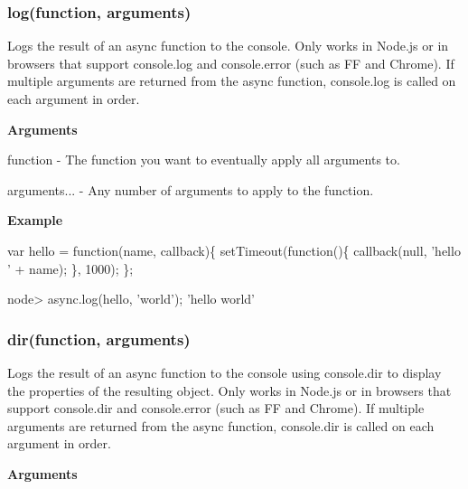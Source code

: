 \label{_log}%
 \subsubsection*{log(function, arguments)}

Logs the result of an {\ttfamily async} function to the {\ttfamily console}. Only works in Node.\+js or in browsers that support {\ttfamily console.\+log} and {\ttfamily console.\+error} (such as F\+F and Chrome). If multiple arguments are returned from the async function, {\ttfamily console.\+log} is called on each argument in order.

{\bfseries Arguments}


\begin{DoxyItemize}
\item {\ttfamily function} -\/ The function you want to eventually apply all arguments to.
\item {\ttfamily arguments...} -\/ Any number of arguments to apply to the function.
\end{DoxyItemize}

{\bfseries Example}


\begin{DoxyCode}
var hello = \textcolor{keyword}{function}(name, callback)\{
    setTimeout(\textcolor{keyword}{function}()\{
        callback(null, \textcolor{stringliteral}{'hello '} + name);
    \}, 1000);
\};
\end{DoxyCode}
 
\begin{DoxyCode}
node> async.log(hello, \textcolor{stringliteral}{'world'});
\textcolor{stringliteral}{'hello world'}
\end{DoxyCode}
 



\label{_dir}%
 \subsubsection*{dir(function, arguments)}

Logs the result of an {\ttfamily async} function to the {\ttfamily console} using {\ttfamily console.\+dir} to display the properties of the resulting object. Only works in Node.\+js or in browsers that support {\ttfamily console.\+dir} and {\ttfamily console.\+error} (such as F\+F and Chrome). If multiple arguments are returned from the async function, {\ttfamily console.\+dir} is called on each argument in order.

{\bfseries Arguments}


